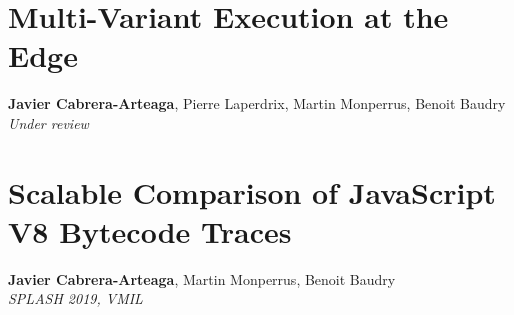 %
    {} %
    {} %
    
\chapter{Multi-Variant Execution at the Edge}

\textbf{Javier Cabrera-Arteaga}, Pierre Laperdrix, Martin Monperrus, Benoit Baudry\\
\emph{Under review}\\

%
    {} %
    {} %
    
\chapter{Scalable Comparison of JavaScript V8 Bytecode Traces}

\textbf{Javier Cabrera-Arteaga}, Martin Monperrus, Benoit Baudry\\
\emph{SPLASH 2019, VMIL}\\


%
    {} %
    {} %
    